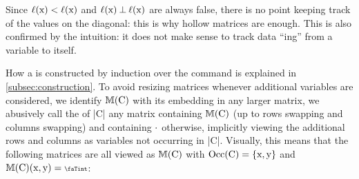 Since \(\lvl{\prc|x|} < \lvl{\prc|x|}\) and $\lvl{\prc|x|} \orth
\lvl{\prc|x|}$ are always false, there is no point keeping track
of the values on the diagonal: this is why hollow matrices
are enough. This is also confirmed by the intuition: it does not make sense to
track data \enquote{ing} from a variable to itself.

How a  is constructed by induction over the command is
explained in \autoref{subsec:construction}. To avoid resizing matrices whenever
additional variables are considered, we identify $\sfm{\prc|C|}$ with
its embedding in any larger matrix, \ie we abusively call the  of \prc|C| any matrix containing $\sfm{\prc|C|}$
(up to rows swapping and columns swapping) and containing \(\cdot\)
otherwise, implicitly viewing the additional rows and columns as variables not
occurring in \prc|C|. Visually, this means that the following
matrices are all viewed as $\sfm{\prc|C|}$ with
\(\Occ(\prc|C|)=\{\prc|x|, \prc|y|\}\) and
$\sfm{\prc|C|}(\prc|x|,\prc|y|)=\vi$:

